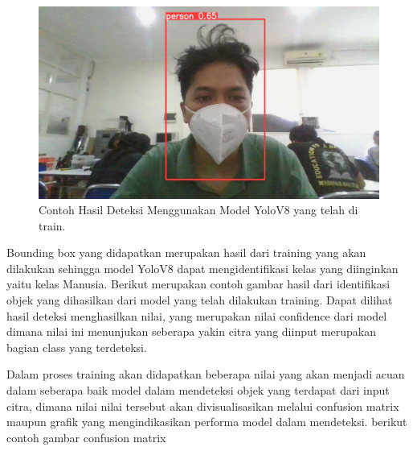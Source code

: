 \begin{figure}[H]
  \centering
  \includegraphics[scale=0.25]{gambar/Foto deteksi untuk bab 2 agung.jpg}
  \caption{Contoh Hasil Deteksi Menggunakan Model YoloV8 yang telah di train.}
  \label{fig:Mengaugmentasi dataset ke roboflow}
\end{figure}


Bounding box yang didapatkan merupakan hasil dari training yang akan dilakukan sehingga model YoloV8 dapat mengidentifikasi kelas yang diinginkan yaitu kelas Manusia. Berikut merupakan contoh gambar hasil dari identifikasi objek yang dihasilkan dari model yang telah dilakukan training. Dapat dilihat hasil deteksi menghasilkan nilai, yang merupakan nilai confidence dari model dimana nilai ini menunjukan seberapa yakin citra yang diinput merupakan bagian class yang terdeteksi.

Dalam proses training akan didapatkan beberapa nilai yang akan menjadi acuan dalam seberapa baik model dalam mendeteksi objek yang terdapat dari input citra, dimana nilai nilai tersebut akan divisualisasikan melalui confusion matrix maupun grafik yang mengindikasikan performa model dalam mendeteksi. berikut contoh gambar confusion matrix

